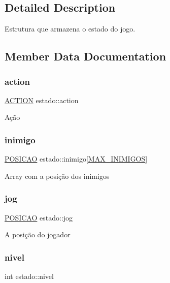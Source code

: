 \subsection{Detailed Description}
Estrutura que armazena o estado do jogo. 

\subsection{Member Data Documentation}
\mbox{\label{structestado_a263dff64a1edc816b4adadcdee584545}} 
\subsubsection{\texorpdfstring{action}{action}}
{\footnotesize\ttfamily \hyperlink{estado_8h_a6bf741bba35d152589c909fdcfe6c0cd}{A\+C\+T\+I\+ON} estado\+::action}

Ação \mbox{\label{structestado_a8f7d47deb337ae082beab6a574ace9e3}} 
\subsubsection{\texorpdfstring{inimigo}{inimigo}}
{\footnotesize\ttfamily \hyperlink{estado_8h_a55b3f4b56938eeb8fa5e8f9c07baf1b0}{P\+O\+S\+I\+C\+AO} estado\+::inimigo\mbox{[}\hyperlink{estado_8h_aa97e6cbfdd94711688f1176cb8dd916a}{M\+A\+X\+\_\+\+I\+N\+I\+M\+I\+G\+OS}\mbox{]}}

Array com a posição dos inimigos \mbox{\label{structestado_abf55d0d40aafdd6829efbc8265b4f724}} 
\subsubsection{\texorpdfstring{jog}{jog}}
{\footnotesize\ttfamily \hyperlink{estado_8h_a55b3f4b56938eeb8fa5e8f9c07baf1b0}{P\+O\+S\+I\+C\+AO} estado\+::jog}

A posição do jogador \mbox{\label{structestado_a6699838dfe62bfa076b99c72d06457d4}} 
\subsubsection{\texorpdfstring{nivel}{nivel}}
{\footnotesize\ttfamily int estado\+::nivel}

